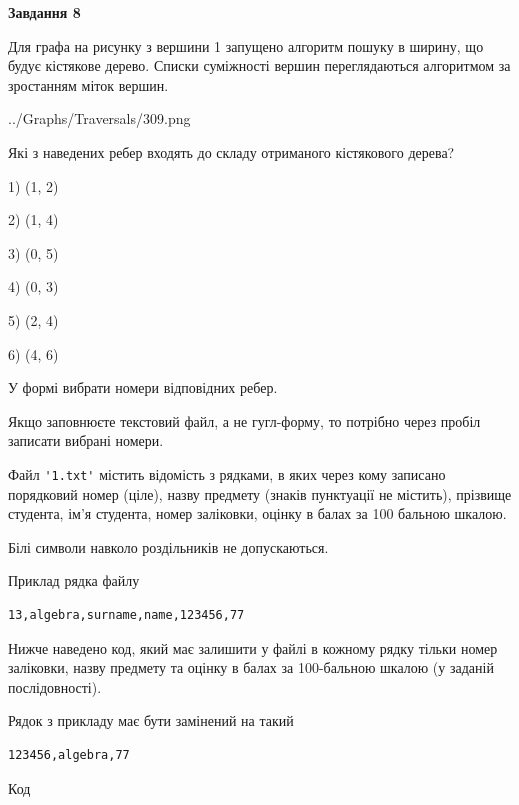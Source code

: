 \documentclass[12pt, ukrainian]{article}
\def\code#1{\Verb!#1!}
\begin{document}
{\begin {large}
{\begin {center}\textbf{Завдання 8}\end {center}}\par
Для графа на рисунку з вершини 1 запущено алгоритм пошуку в ширину, що будує кістякове дерево. Списки суміжності вершин переглядаються алгоритмом за зростанням міток вершин.\par
\begin{center}
	{../Graphs/Traversals/309.png}
\end{center}
\par Які з наведених ребер входять до складу отриманого кістякового дерева?\par
1) (1, 2)\par
2) (1, 4)\par
3) (0, 5)\par
4) (0, 3)\par
5) (2, 4)\par
6) (4, 6)\par
{\vskip 15pt} У формі вибрати номери відповідних ребер.


Якщо заповнюєте текстовий файл, а не гугл-форму, то потрібно через пробіл записа\-ти вибрані номери.\par
\newpage


Файл \code{'1.txt'} містить відомість з рядками, в яких через кому записа\-но поряд\-ковий номер (ціле), назву предмету (знаків пунктуації не містить), прізвище студента, ім'я студента, номер заліковки, оцінку в балах за 100 бальною шкалою.

Білі символи навколо роздільників не допускаються.

Приклад рядка файлу



\begin{verbatim}
13,algebra,surname,name,123456,77
\end{verbatim}


Нижче наведено код, який має залишити у файлі в кожному рядку тільки номер заліковки, назву предмету та оцінку в балах за 100-бальною шкалою (у заданій послі\-дов\-ності).

Рядок з прикладу має бути замінений на такий



\begin{verbatim}
123456,algebra,77
\end{verbatim}




Код




\end{large}}
\end{document}
